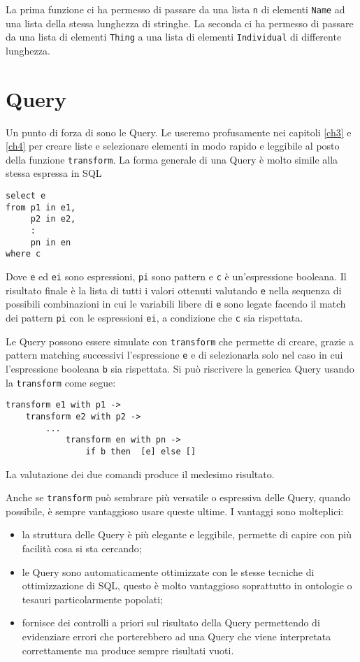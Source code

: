 La prima funzione ci ha permesso di passare da una lista \verb|n| di elementi \verb|Name| ad una lista della stessa lunghezza di stringhe. La seconda ci ha permesso di passare da una lista di elementi \verb|Thing| a una lista di elementi \verb|Individual| di differente lunghezza.
\section{Query}
Un punto di forza di \cduce sono le Query. Le useremo profusamente nei capitoli \ref{ch3} e \ref{ch4} per creare liste e selezionare elementi in modo rapido e leggibile al posto della  funzione \verb|transform|.
La forma generale di una Query è molto simile alla stessa espressa in SQL
\begin{verbatim}
select e 
from p1 in e1,
	 p2 in e2,
	 :
	 pn in en
where c
\end{verbatim}
Dove \verb|e| ed \verb|ei| sono espressioni, \verb|pi| sono pattern e \verb|c| è un'espressione booleana. Il risultato finale è la lista di tutti i valori ottenuti valutando \verb|e| nella sequenza di possibili combinazioni in cui le variabili libere di \verb|e| sono legate facendo il match dei pattern \verb|pi| con le espressioni \verb|ei|, a condizione che \verb|c| sia rispettata.

Le Query possono essere simulate con \verb|transform| che permette di creare, grazie a pattern matching successivi l'espressione \verb|e| e di selezionarla solo nel caso in cui l'espressione booleana \verb|b| sia rispettata. Si può riscrivere la generica Query usando la \verb|transform| come segue:
\begin{verbatim}
transform e1 with p1 -> 
	transform e2 with p2 -> 
		...
			transform en with pn -> 
				if b then  [e] else []
\end{verbatim}
La valutazione dei due comandi produce il medesimo risultato.

Anche se \verb|transform| può sembrare più versatile o espressiva delle Query, quando possibile, è sempre vantaggioso usare queste ultime. I vantaggi sono molteplici:
\begin{itemize}
	\item la struttura delle Query è più elegante e leggibile, permette di capire con più facilità cosa si sta cercando;
	\item le Query sono automaticamente ottimizzate con le stesse tecniche di ottimizzazione di SQL, questo è molto vantaggioso soprattutto in ontologie o tesauri particolarmente popolati;
	\item \cduce fornisce dei controlli a priori sul risultato della Query permettendo di evidenziare errori che porterebbero ad una Query che viene interpretata correttamente ma produce sempre risultati vuoti.
\end{itemize}

